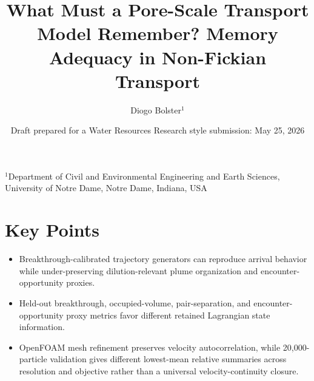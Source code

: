 \documentclass[11pt]{article}
\title{What Must a Pore-Scale Transport Model Remember? Memory Adequacy in Non-Fickian Transport}
\author{Diogo Bolster$^{1}$}
\date{Draft prepared for a Water Resources Research style submission: May 25, 2026}
\begin{document}
\maketitle

\noindent$^{1}$Department of Civil and Environmental Engineering and Earth Sciences, University of Notre Dame, Notre Dame, Indiana, USA

\section*{Key Points}
\begin{itemize}
  \item Breakthrough-calibrated trajectory generators can reproduce arrival behavior while under-preserving dilution-relevant plume organization and encounter-opportunity proxies.
  \item Held-out breakthrough, occupied-volume, pair-separation, and encounter-opportunity proxy metrics favor different retained Lagrangian state information.
  \item OpenFOAM mesh refinement preserves velocity autocorrelation, while 20,000-particle validation gives different lowest-mean relative summaries across resolution and objective rather than a universal velocity-continuity closure.
\end{itemize}
\end{document}
